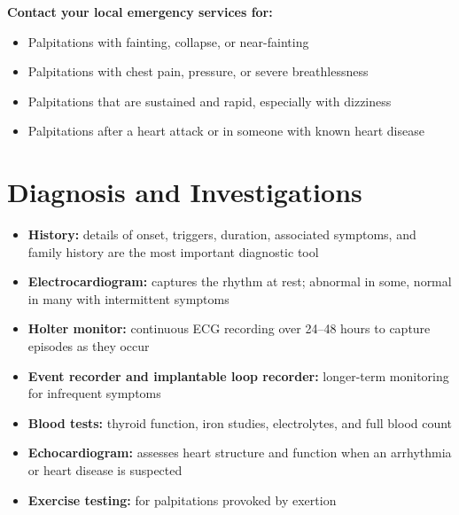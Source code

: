 \textbf{Contact your local emergency services for:}
\begin{itemize}
    \item Palpitations with fainting, collapse, or near-fainting
    \item Palpitations with chest pain, pressure, or severe breathlessness
    \item Palpitations that are sustained and rapid, especially with dizziness
    \item Palpitations after a heart attack or in someone with known heart disease
\end{itemize}

\section*{Diagnosis and Investigations}
\begin{itemize}
    \item \textbf{History:} details of onset, triggers, duration, associated symptoms, and family history are the most important diagnostic tool
    \item \textbf{Electrocardiogram:} captures the rhythm at rest; abnormal in some, normal in many with intermittent symptoms
    \item \textbf{Holter monitor:} continuous ECG recording over 24--48 hours to capture episodes as they occur
    \item \textbf{Event recorder and implantable loop recorder:} longer-term monitoring for infrequent symptoms
    \item \textbf{Blood tests:} thyroid function, iron studies, electrolytes, and full blood count
    \item \textbf{Echocardiogram:} assesses heart structure and function when an arrhythmia or heart disease is suspected
    \item \textbf{Exercise testing:} for palpitations provoked by exertion
\end{itemize}

